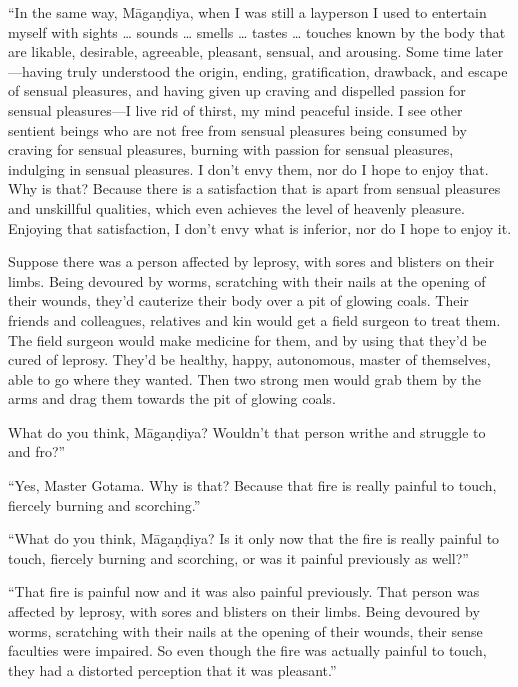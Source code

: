 \documentclass[12pt,openany]{book}%
\begin{document}
“In the same way, \textsanskrit{Māgaṇḍiya}, when I was still a layperson I used to entertain myself with sights … sounds … smells … tastes … touches known by the body that are likable, desirable, agreeable, pleasant, sensual, and arousing. Some time later—having truly understood the origin, ending, gratification, drawback, and escape of sensual pleasures, and having given up craving and dispelled passion for sensual pleasures—I live rid of thirst, my mind peaceful inside. I see other sentient beings who are not free from sensual pleasures being consumed by craving for sensual pleasures, burning with passion for sensual pleasures, indulging in sensual pleasures. I don’t envy them, nor do I hope to enjoy that. Why is that? Because there is a satisfaction that is apart from sensual pleasures and unskillful qualities, which even achieves the level of heavenly pleasure. Enjoying that satisfaction, I don’t envy what is inferior, nor do I hope to enjoy it. 

Suppose there was a person affected by leprosy, with sores and blisters on their limbs. Being devoured by worms, scratching with their nails at the opening of their wounds, they’d cauterize their body over a pit of glowing coals. Their friends and colleagues, relatives and kin would get a field surgeon to treat them. The field surgeon would make medicine for them, and by using that they’d be cured of leprosy. They’d be healthy, happy, autonomous, master of themselves, able to go where they wanted. Then two strong men would grab them by the arms and drag them towards the pit of glowing coals. 

What do you think, \textsanskrit{Māgaṇḍiya}? Wouldn’t that person writhe and struggle to and fro?” 

“Yes, Master Gotama. Why is that? Because that fire is really painful to touch, fiercely burning and scorching.” 

“What do you think, \textsanskrit{Māgaṇḍiya}? Is it only now that the fire is really painful to touch, fiercely burning and scorching, or was it painful previously as well?” 

“That fire is painful now and it was also painful previously. That person was affected by leprosy, with sores and blisters on their limbs. Being devoured by worms, scratching with their nails at the opening of their wounds, their sense faculties were impaired. So even though the fire was actually painful to touch, they had a distorted perception that it was pleasant.” 
\end{document}
